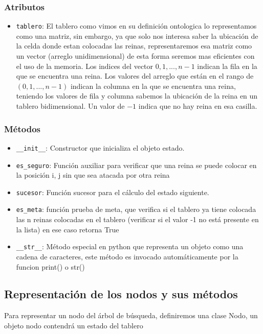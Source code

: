 \documentclass[conference]{IEEEtran}
\begin{document}
\subsubsection{Atributos}\label{AA_1}
\begin{itemize}
\item \texttt{tablero}: El tablero como vimos en su definición ontologica lo representamos como una matriz, sin embargo, ya que solo nos interesa saber la ubicación de la celda donde estan colocadas las reinas,  representaremos esa matriz como un vector (arreglo unidimensional) de esta forma seremos mas eficientes con el uso de la memoria. Los indices del vector $0, 1, ..., n-1$ indican la fila en la que se encuentra una reina. Los valores del arreglo que están en el rango de $(0, 1, ..., n-1)$ indican la columna en la que se encuentra una reina, teniendo los valores de fila y columna sabemos la ubicación de la reina en un tablero bidimensional. Un valor de $-1$ indica que no hay reina en esa casilla.
\end{itemize}
\subsubsection{Métodos}\label{AA_1}
\begin{itemize}
\item \texttt{\_\_init\_\_}: Constructor que inicializa el objeto estado.
\item \texttt{es\_seguro}: Función auxiliar para verificar que una reina se puede colocar en la posición i, j sin que sea atacada por otra reina
\item \texttt{sucesor}: Función sucesor para el cálculo del estado siguiente.
\item \texttt{es\_meta}: función prueba de meta, que verifica si el tablero ya tiene colocada las n reinas colocadas en el tablero (verificar si el valor -1 no está presente en la lista) en ese caso retorna True
\item \texttt{\_\_str\_\_}: Método especial en python que representa un objeto como una cadena de caracteres, este método es invocado automáticamente por la funcion print() o str()
\end{itemize}

\subsection{Representación de los nodos y sus métodos}
Para representar un nodo del árbol de búsqueda, definiremos una clase Nodo, un objeto nodo contendrá un estado del tablero
\end{document}
